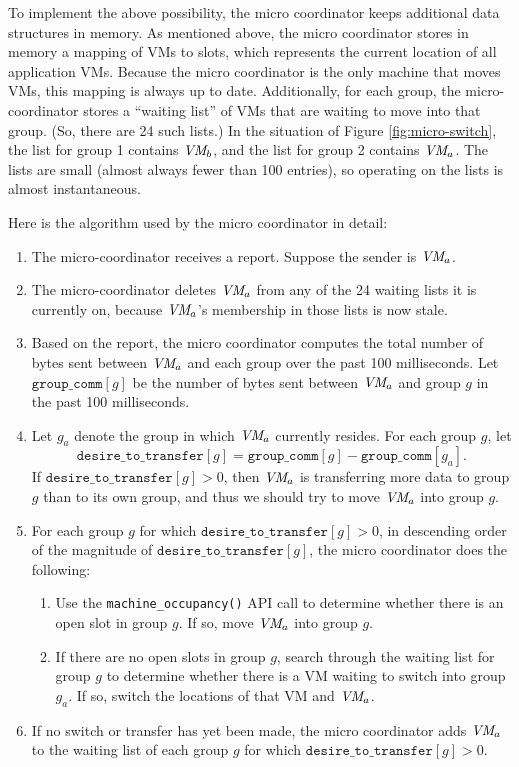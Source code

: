 \documentclass[11pt]{article}
\begin{document}
To implement the above possibility, the micro coordinator keeps additional data structures in memory.  As mentioned above, the micro coordinator stores in memory a mapping of VMs to slots, which represents the current location of all application VMs.  Because the micro coordinator is the only machine that moves VMs, this mapping is always up to date.  Additionally, for each group, the micro-coordinator stores a ``waiting list'' of VMs that are waiting to move into that group.  (So, there are 24 such lists.)  In the situation of Figure \ref{fig:micro-switch}, the list for group 1 contains $\textit{VM}_b$, and the list for group 2 contains $\textit{VM}_a$.  The lists are small (almost always fewer than 100 entries), so operating on the lists is almost instantaneous.

Here is the algorithm used by the micro coordinator in detail:
\begin{enumerate}
  \item The micro-coordinator receives a report.  Suppose the sender is $\textit{VM}_a$.
  \item The micro-coordinator deletes $\textit{VM}_a$ from any of the 24 waiting lists it is currently on, because $\textit{VM}_a$'s membership in those lists is now stale.
  \item Based on the report, the micro coordinator computes the total number of bytes sent between $\textit{VM}_a$ and each group over the past 100 milliseconds.  Let $\texttt{group\_comm}[g]$ be the number of bytes sent between $\textit{VM}_a$ and group $g$ in the past 100 milliseconds.
  \item Let $g_a$ denote the group in which $\textit{VM}_a$ currently resides.  For each group $g$, let
    \[ \texttt{desire\_to\_transfer}[g] = \texttt{group\_comm}[g] - \texttt{group\_comm}[g_a]. \]
    If $\texttt{desire\_to\_transfer}[g] > 0$, then $\textit{VM}_a$ is transferring more data to group $g$ than to its own group, and thus we should try to move $\textit{VM}_a$ into group $g$.
  \item For each group $g$ for which $\texttt{desire\_to\_transfer}[g] > 0$, in descending order of the magnitude of $\texttt{desire\_to\_transfer}[g]$, the micro coordinator does the following:
    \begin{enumerate}[label=(\alph{*})]
      \item Use the \texttt{machine\_occupancy()} API call to determine whether there is an open slot in group $g$.  If so, move $\textit{VM}_a$ into group $g$.
      \item If there are no open slots in group $g$, search through the waiting list for group $g$ to determine whether there is a VM waiting to switch into group $g_a$.  If so, switch the locations of that VM and $\textit{VM}_a$.
    \end{enumerate}

  \item If no switch or transfer has yet been made, the micro coordinator adds $\textit{VM}_a$ to the waiting list of each group $g$ for which $\texttt{desire\_to\_transfer}[g] > 0$.
\end{enumerate}
\end{document}
